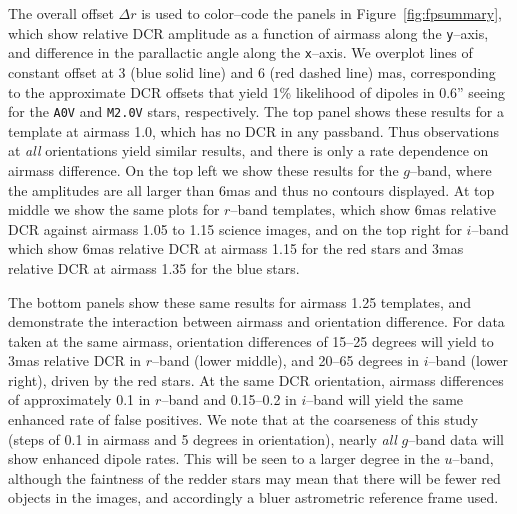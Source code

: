 \documentclass[prd, nofootinbib, floatfix, 11pt, tightenlines, times]{article}
\begin{document}
The overall offset $\Delta r$ is used to color--code the panels in
Figure~\ref{fig:fpsummary}, which show relative DCR amplitude as a
function of airmass along the {\tt y}--axis, and difference in the
parallactic angle along the {\tt x}--axis.  We overplot lines of
constant offset at 3 (blue solid line) and 6 (red dashed line) mas,
corresponding to the approximate DCR offsets that yield 1\% likelihood
of dipoles in 0.6'' seeing for the {\tt A0V} and {\tt M2.0V} stars,
respectively.  The top panel shows these results for a template at
airmass 1.0, which has no DCR in any passband.  Thus observations at
{\it all} orientations yield similar results, and there is only a rate
dependence on airmass difference.  On the top left we show these
results for the $g$--band, where the amplitudes are all larger than
6mas and thus no contours displayed.  At top middle we show the same
plots for $r$--band templates, which show 6mas relative DCR against
airmass 1.05 to 1.15 science images, and on the top right for
$i$--band which show 6mas relative DCR at airmass 1.15 for the red
stars and 3mas relative DCR at airmass 1.35 for the blue stars.

The bottom panels show these same results for airmass 1.25 templates,
and demonstrate the interaction between airmass and orientation
difference.  For data taken at the same airmass, orientation
differences of 15--25 degrees will yield to 3mas relative DCR in
$r$--band (lower middle), and 20--65 degrees in $i$--band (lower
right), driven by the red stars.  At the same DCR orientation, airmass
differences of approximately 0.1 in $r$--band and 0.15--0.2 in
$i$--band will yield the same enhanced rate of false positives.  We
note that at the coarseness of this study (steps of 0.1 in airmass and
5 degrees in orientation), nearly {\it all} $g$--band data will show
enhanced dipole rates.  This will be seen to a larger degree in the
$u$--band, although the faintness of the redder stars may mean that
there will be fewer red objects in the images, and accordingly a bluer
astrometric reference frame used.
\end{document}
